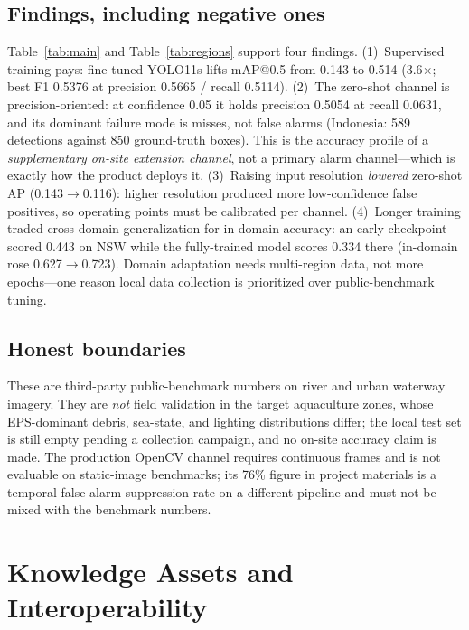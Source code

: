 \documentclass[conference]{IEEEtran}
\begin{document}
\subsection{Findings, including negative ones}
Table~\ref{tab:main} and Table~\ref{tab:regions} support four findings.
(1)~Supervised training pays: fine-tuned YOLO11s lifts mAP@0.5 from 0.143
to 0.514 (3.6$\times$; best F1 0.5376 at precision 0.5665 / recall 0.5114).
(2)~The zero-shot channel is precision-oriented: at confidence 0.05 it
holds precision 0.5054 at recall 0.0631, and its dominant failure mode is
misses, not false alarms (Indonesia: 589 detections against 850 ground-truth
boxes). This is the accuracy profile of a \emph{supplementary on-site
extension channel}, not a primary alarm channel---which is exactly how the
product deploys it. (3)~Raising input resolution \emph{lowered} zero-shot AP
(0.143$\to$0.116): higher resolution produced more low-confidence false
positives, so operating points must be calibrated per channel. (4)~Longer
training traded cross-domain generalization for in-domain accuracy: an
early checkpoint scored 0.443 on NSW while the fully-trained model scores
0.334 there (in-domain rose 0.627$\to$0.723). Domain adaptation needs
multi-region data, not more epochs---one reason local data collection is
prioritized over public-benchmark tuning.

\subsection{Honest boundaries}
These are third-party public-benchmark numbers on river and urban waterway
imagery. They are \emph{not} field validation in the target aquaculture
zones, whose EPS-dominant debris, sea-state, and lighting distributions
differ; the local test set is still empty pending a collection campaign, and
no on-site accuracy claim is made. The production OpenCV channel requires
continuous frames and is not evaluable on static-image benchmarks; its
76\% figure in project materials is a temporal false-alarm suppression rate
on a different pipeline and must not be mixed with the benchmark numbers.

\section{Knowledge Assets and Interoperability}
\label{sec:knowledge}
\end{document}
